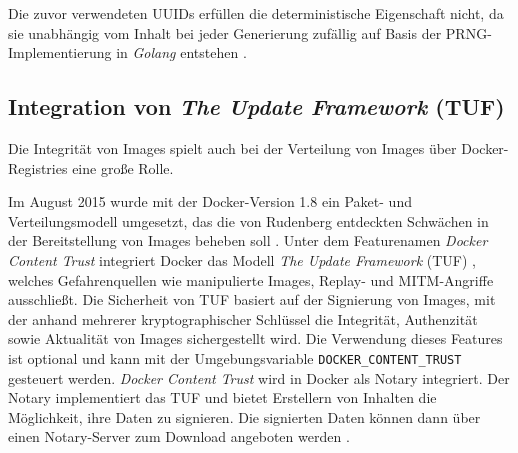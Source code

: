 \documentclass[../main.tex]{subfiles}
\begin{document}
      Die zuvor verwendeten UUIDs erfüllen die deterministische Eigenschaft nicht, da sie unabhängig vom Inhalt bei jeder Generierung zufällig auf Basis der \acrshort{PRNG}-Implementierung in \emph{Golang} entstehen \cite{githubImageUUID}.





    \subsection{Integration von \emph{The Update Framework} (\acrshort{TUF})}
    \label{tuf}
      Die Integrität von Images spielt auch bei der Verteilung von Images über Docker-Registries eine große Rolle.

      Im August 2015 wurde mit der Docker-Version 1.8 ein Paket- und Verteilungsmodell umgesetzt, das die von Rudenberg entdeckten Schwächen in der Bereitstellung von Images beheben soll \cite{dockerContentTrust}. Unter dem Featurenamen \emph{Docker Content Trust} integriert Docker das Modell \emph{The Update Framework} (\acrshort{TUF}) \cite{tufFramework}, welches Gefahrenquellen wie manipulierte Images, Replay- und MITM-Angriffe ausschließt. Die Sicherheit von TUF basiert auf der Signierung von Images, mit der anhand mehrerer kryptographischer Schlüssel die Integrität, Authenzität sowie Aktualität von Images sichergestellt wird. Die Verwendung dieses Features ist optional und kann mit der Umgebungsvariable \texttt{DOCKER\_CONTENT\_TRUST} gesteuert werden. \emph{Docker Content Trust} wird in Docker als Notary integriert. Der Notary implementiert das TUF und bietet Erstellern von Inhalten die Möglichkeit, ihre Daten zu signieren. Die signierten Daten können dann über einen Notary-Server zum Download angeboten werden \cite{githubNotary}\cite{dockerContentTrust}.
\end{document}
